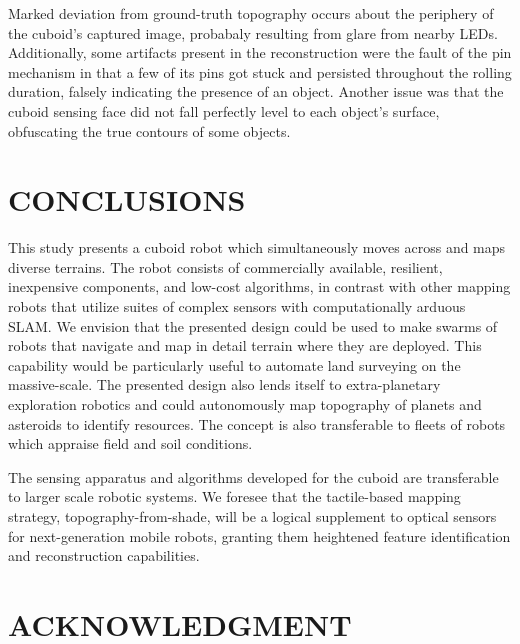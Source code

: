 \documentclass[letterpaper, 12 pt, conference]{ieeeconf}  %
\begin{document}
Marked deviation from ground-truth topography occurs about the periphery of the cuboid's captured image, probabaly resulting from glare from nearby LEDs. Additionally, some artifacts present in the reconstruction were the fault of the pin mechanism in that a few of its pins got stuck and persisted throughout the rolling duration, falsely indicating the presence of an object. Another issue was that the cuboid sensing face did not fall perfectly level to each object's surface, obfuscating the true contours of some objects. 

\section{CONCLUSIONS}

This study presents a cuboid robot which simultaneously moves across and maps diverse terrains. The robot consists of commercially available, resilient, inexpensive components, and low-cost algorithms, in contrast with other mapping robots that utilize suites of complex sensors with computationally arduous SLAM. We envision that the presented design could be used to make swarms of robots that navigate and map in detail terrain where they are deployed. This capability would be particularly useful to automate land surveying on the massive-scale. The presented design also lends itself to extra-planetary exploration robotics and could autonomously map topography of planets and asteroids to identify resources. The concept is also transferable to fleets of robots which appraise field and soil conditions. 

The sensing apparatus and algorithms developed for the cuboid are transferable to larger scale robotic systems. We foresee that the tactile-based mapping strategy, topography-from-shade, will be a logical supplement to optical sensors for next-generation mobile robots, granting them heightened feature identification and reconstruction capabilities. 


\addtolength{\textheight}{-12cm}   


\section*{ACKNOWLEDGMENT}
\end{document}
